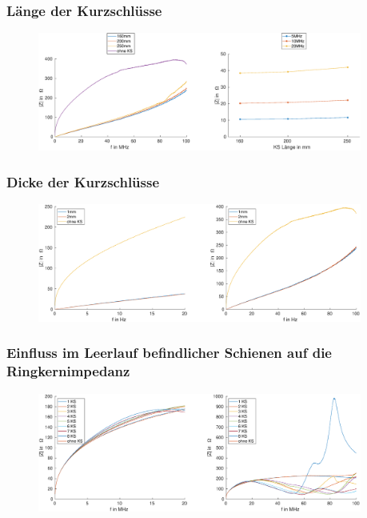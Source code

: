 \documentclass[accentcolor=tud9b, colorbacktitle, inverttitle]{tudbeamer}
\begin{document}
\begin{frame}\frametitle{Länge der Kurzschlüsse}
\vspace{-1em}
\begin{figure}[h]
	\centering
	\includegraphics[width=0.95\textwidth]{Z_ges_length_frequency_SimMeas}
\end{figure}
\end{frame}





\begin{frame}\frametitle{Dicke der Kurzschlüsse}
\vspace{-1em}
\begin{figure}[h]
	\centering
	\includegraphics[width=0.95\textwidth]{Z_RK_thick_1KS}
\end{figure}
\end{frame}



\begin{frame}\frametitle{Einfluss im Leerlauf befindlicher Schienen auf die Ringkernimpedanz}
\vspace{-1em}
\begin{figure}[h]
	\centering
	\includegraphics[width=0.95\textwidth]{Z_RK_numKS_open}
\end{figure}
\end{frame}
\end{document}

